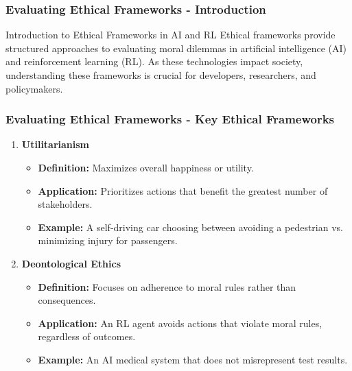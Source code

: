 \documentclass[aspectratio=169]{beamer}
\begin{document}
\begin{frame}[fragile]
    \frametitle{Evaluating Ethical Frameworks - Introduction}
    \begin{block}{Introduction to Ethical Frameworks in AI and RL}
        Ethical frameworks provide structured approaches to evaluating moral dilemmas in artificial intelligence (AI) and reinforcement learning (RL). As these technologies impact society, understanding these frameworks is crucial for developers, researchers, and policymakers. 
    \end{block}
\end{frame}

\begin{frame}[fragile]
    \frametitle{Evaluating Ethical Frameworks - Key Ethical Frameworks}
    \begin{enumerate}
        \item \textbf{Utilitarianism}
            \begin{itemize}
                \item \textbf{Definition:} Maximizes overall happiness or utility.
                \item \textbf{Application:} Prioritizes actions that benefit the greatest number of stakeholders.
                \item \textbf{Example:} A self-driving car choosing between avoiding a pedestrian vs. minimizing injury for passengers.
            \end{itemize}
        \item \textbf{Deontological Ethics}
            \begin{itemize}
                \item \textbf{Definition:} Focuses on adherence to moral rules rather than consequences.
                \item \textbf{Application:} An RL agent avoids actions that violate moral rules, regardless of outcomes.
                \item \textbf{Example:} An AI medical system that does not misrepresent test results.
            \end{itemize}
    \end{enumerate}
\end{frame}
\end{document}
